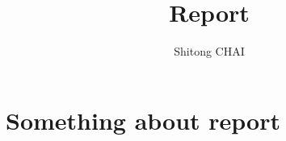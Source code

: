 \documentclass[a4paper]{report}
\title{Report}
\date{}
\author{Shitong CHAI}
\begin{document}
\maketitle
\tableofcontents

\chapter {Something about report\cite{Nobody06}}



{}

\end{document}
